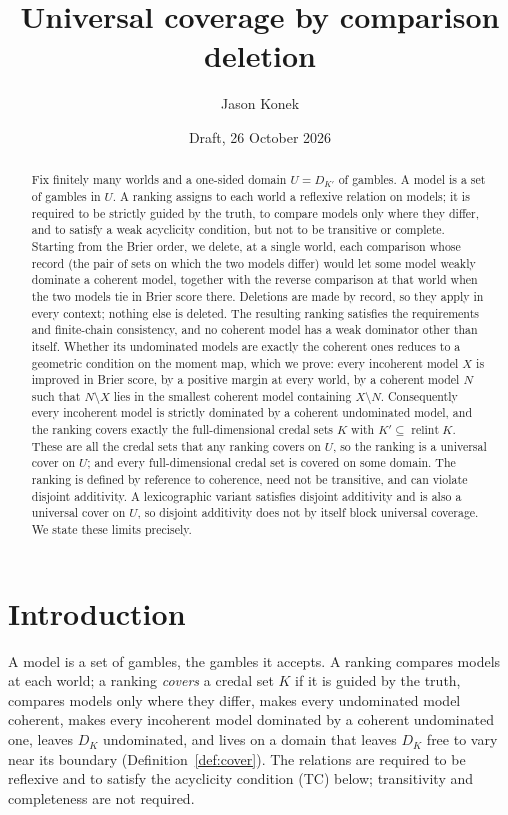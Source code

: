\documentclass[11pt]{article}
\title{Universal coverage by comparison deletion}
\author{Jason Konek}
\date{Draft, 26 October 2026}
\DeclareMathOperator{\relint}{relint}
\theoremstyle{plain}
\theoremstyle{definition}
\theoremstyle{remark}
\begin{document}
\maketitle

\begin{abstract}
Fix finitely many worlds and a one-sided domain $U=D_{K'}$ of gambles. A model is a set
of gambles in $U$. A ranking assigns to each world a reflexive relation on models; it is
required to be strictly guided by the truth, to compare models only where they differ,
and to satisfy a weak acyclicity condition, but not to be transitive or complete.
Starting from the Brier order, we delete, at a single world, each comparison whose record
(the pair of sets on which the two models differ) would let some model weakly dominate a
coherent model, together with the reverse comparison at that world when the two models
tie in Brier score there. Deletions are made by record, so they apply in every context;
nothing else is deleted. The resulting ranking
satisfies the requirements and finite-chain consistency, and no coherent model has a weak
dominator other than itself. Whether its undominated models are exactly the coherent ones
reduces to a geometric condition on the moment map, which we prove: every incoherent model
$X$ is improved in Brier score, by a positive margin at every world, by a coherent model
$N$ such that $N\setminus X$ lies in the smallest coherent model containing $X\setminus
N$. Consequently every incoherent model is strictly dominated by a coherent undominated
model, and the ranking covers exactly the full-dimensional credal sets $K$ with
$K'\subseteq\relint K$. These are all the credal sets that any ranking covers on $U$, so
the ranking is a universal cover on $U$; and every full-dimensional credal set is covered
on some domain. The ranking is defined by reference to coherence, need not be transitive,
and can violate disjoint additivity. A lexicographic variant satisfies disjoint
additivity and is also a universal cover on $U$, so disjoint additivity does not by
itself block universal coverage. We state these limits precisely.
\end{abstract}

\section{Introduction}\label{sec:intro}

A model is a set of gambles, the gambles it accepts. A ranking compares models at each
world; a ranking \emph{covers} a credal set $K$ if it is guided by the truth,
compares models only where they differ, makes every undominated model coherent, makes
every incoherent model dominated by a coherent undominated one, leaves $D_K$
undominated, and lives on a domain that leaves $D_K$ free to vary near its boundary
(Definition~\ref{def:cover}). The relations are required to be reflexive and to satisfy
the acyclicity condition (TC) below; transitivity and completeness are not required.
\end{document}
